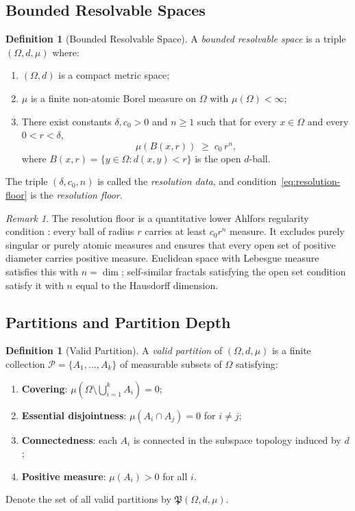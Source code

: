 \documentclass[12pt,a4paper,twocolumn]{article}
\theoremstyle{plain}
\theoremstyle{definition}
\newtheorem{definition}[theorem]{Definition}
\theoremstyle{remark}
\newtheorem{remark}[theorem]{Remark}
\newcommand{\Part}{\mathcal{P}}
\newcommand{\BRS}{(\Omega,d,\mu)}
\begin{document}
\subsection{Bounded Resolvable Spaces}

\begin{definition}[Bounded Resolvable Space]
\label{def:brs}
A \emph{bounded resolvable space} is a triple $\BRS$ where:
\begin{enumerate}[label=(\roman*)]
  \item $(\Omega, d)$ is a compact metric space;
  \item $\mu$ is a finite non-atomic Borel measure on $\Omega$ with
    $\mu(\Omega) < \infty$;
  \item There exist constants $\delta, c_0 > 0$ and $n \geq 1$ such that
    for every $x \in \Omega$ and every $0 < r < \delta$,
    \begin{equation}
      \mu\!\left(B(x,r)\right) \;\geq\; c_0\, r^n,
      \label{eq:resolution-floor}
    \end{equation}
    where $B(x,r) = \{y \in \Omega : d(x,y) < r\}$ is the open $d$-ball.
\end{enumerate}
The triple $(\delta, c_0, n)$ is called the \emph{resolution data}, and
condition~\eqref{eq:resolution-floor} is the \emph{resolution floor}.
\end{definition}

\begin{remark}
The resolution floor is a quantitative lower Ahlfors regularity condition
\citep{mattila1995geometry, falconer2003fractal}: every ball of radius $r$
carries at least $c_0 r^n$ measure.  It excludes purely singular or purely
atomic measures and ensures that every open set of positive diameter carries
positive measure.  Euclidean space with Lebesgue measure satisfies this with
$n = \dim$; self-similar fractals satisfying the open set condition satisfy
it with $n$ equal to the Hausdorff dimension.
\end{remark}

\subsection{Partitions and Partition Depth}

\begin{definition}[Valid Partition]
\label{def:partition}
A \emph{valid partition} of $\BRS$ is a finite collection
$\Part = \{A_1, \ldots, A_k\}$ of measurable subsets of $\Omega$ satisfying:
\begin{enumerate}[label=(\roman*)]
  \item \textbf{Covering}: $\mu\!\left(\Omega \setminus \bigcup_{i=1}^k A_i\right) = 0$;
  \item \textbf{Essential disjointness}: $\mu(A_i \cap A_j) = 0$ for $i \neq j$;
  \item \textbf{Connectedness}: each $A_i$ is connected in the subspace
    topology induced by $d$;
  \item \textbf{Positive measure}: $\mu(A_i) > 0$ for all $i$.
\end{enumerate}
Denote the set of all valid partitions by $\mathfrak{P}(\Omega,d,\mu)$.
\end{definition}
\end{document}
